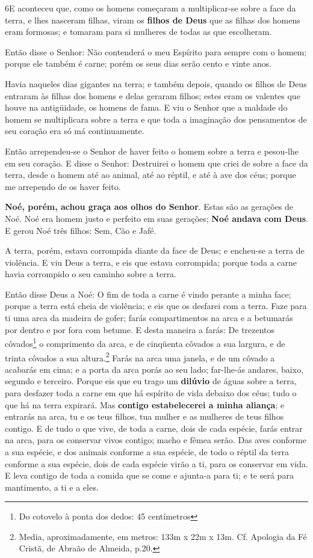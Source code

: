 \smallskip

\lettrine{6} E aconteceu que, como os homens começaram a
multiplicar-se sobre a face da terra, e lhes nasceram filhas,
viram os \textbf{filhos de Deus} que as filhas dos homens eram
formosas; e tomaram para si mulheres de todas as que escolheram.

Então disse o Senhor: Não contenderá o meu Espírito para sempre
com o homem; porque ele também é carne; porém os seus dias serão
cento e vinte anos.

Havia naqueles dias gigantes na terra; e também depois, quando os
filhos de Deus entraram às filhas dos homens e delas geraram filhos;
estes eram os valentes que houve na antigüidade, os homens de fama.
E viu o Senhor que a maldade do homem se multiplicara sobre a
terra e que toda a imaginação dos pensamentos de seu coração era só
má continuamente.

Então arrependeu-se o Senhor de haver feito o homem sobre a terra
e pesou-lhe em seu coração. E disse o Senhor: Destruirei o homem
que criei de sobre a face da terra, desde o homem até ao animal, até
ao réptil, e até à ave dos céus; porque me arrependo de os haver
feito.

\textbf{Noé, porém, achou graça aos olhos do Senhor}. Estas
são as gerações de Noé. Noé era homem justo e perfeito em suas
gerações; \textbf{Noé andava com Deus}. E gerou Noé três
filhos: Sem, Cão e Jafé.

A terra, porém, estava corrompida diante da face de Deus; e
encheu-se a terra de violência. E viu Deus a terra, e eis que
estava corrompida; porque toda a carne havia corrompido o seu
caminho sobre a terra.

Então disse Deus a Noé: O fim de toda a carne é vindo perante a
minha face; porque a terra está cheia de violência; e eis que os
desfarei com a terra. Faze para ti uma arca da madeira de
gofer; farás compartimentos na arca e a betumarás por dentro e por
fora com betume. E desta maneira a farás: De trezentos
côvados\footnote{Do cotovelo à ponta dos dedos: 45 centímetros} o
comprimento da arca, e de cinqüenta côvados a sua largura, e de
trinta côvados a sua altura.\footnote{Media, aproximadamente, em
metros: 133m x 22m x 13m. Cf. Apologia da Fé Cristã, de Abraão de
Almeida, p.20.} Farás na arca uma janela, e de um côvado a
acabarás em cima; e a porta da arca porás ao seu lado; far-lhe-ás
andares, baixo, segundo e terceiro. Porque eis que eu trago
um \textbf{dilúvio} de águas sobre a terra, para desfazer toda a
carne em que há espírito de vida debaixo dos céus; tudo o que há na
terra expirará. Mas \textbf{contigo estabelecerei a minha
aliança}; e entrarás na arca, tu e os teus filhos, tua mulher e as
mulheres de teus filhos contigo. E de tudo o que vive, de
toda a carne, dois de cada espécie, farás entrar na arca, para os
conservar vivos contigo; macho e fêmea serão. Das aves
conforme a sua espécie, e dos animais conforme a sua espécie, de
todo o réptil da terra conforme a sua espécie, dois de cada espécie
virão a ti, para os conservar em vida. E leva contigo de toda
a comida que se come e ajunta-a para ti; e te será para mantimento,
a ti e a eles.

